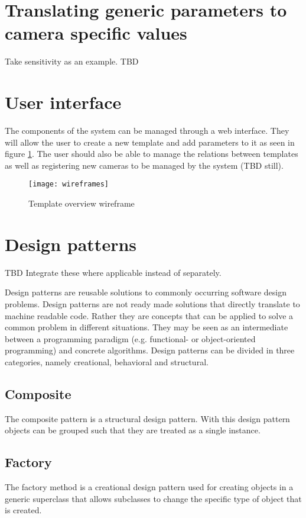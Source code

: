 \section{Translating generic parameters to camera specific values}
Take sensitivity as an example. TBD

\section{User interface}
The components of the system can be managed through a web interface.
They will allow the user to create a new template and add parameters to it as seen in figure \ref{fig:templatewireframe}.
The user should also be able to manage the relations between templates as well as registering new cameras to be managed by the system (TBD still).
\begin{figure}[h!]
	\centering
	\texttt{[image: wireframes]}
	\caption{Template overview  wireframe}
	\label{fig:templatewireframe}
\end{figure}

\section{Design patterns}
TBD Integrate these where applicable instead of separately.

Design patterns are reusable solutions to commonly occurring software design problems. Design patterns are not ready made solutions that directly translate to machine readable code. Rather they are concepts that can be applied to solve a common problem in different situations. They may be seen as an intermediate between a programming paradigm (e.g. functional- or object-oriented programming) and
concrete algorithms. Design patterns can be divided in three categories, namely creational, behavioral and structural.

\subsection{Composite}
The composite pattern is a structural design pattern. With this design pattern objects can be grouped such that they are treated as a
single instance.

\subsection{Factory}
The factory method is a creational design pattern used for creating objects in a generic superclass that allows subclasses to change the
specific type of object that is created.

